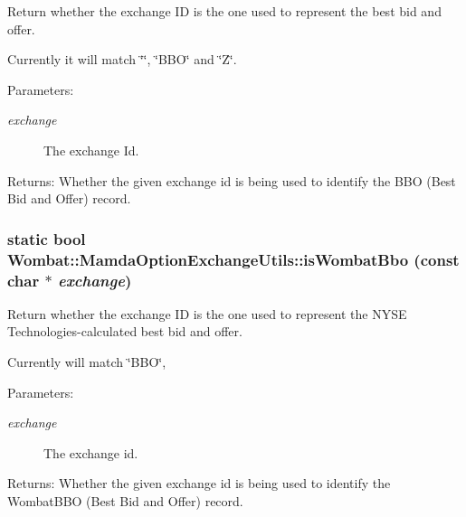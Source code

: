 Return whether the exchange ID is the one used to represent the best bid and offer. 

Currently it will match \char`\"{}\char`\"{}, \char`\"{}BBO\char`\"{} and \char`\"{}Z\char`\"{}.

\begin{Desc}
\item[Parameters:]
\begin{description}
\item[{\em exchange}]The exchange Id.\end{description}
\end{Desc}
\begin{Desc}
\item[Returns:]Whether the given exchange id is being used to identify the BBO (Best Bid and Offer) record. \end{Desc}
\hypertarget{classWombat_1_1MamdaOptionExchangeUtils_f667d49e25e581cd95a39b1fda2802c1}{
\subsubsection[isWombatBbo]{\setlength{\rightskip}{0pt plus 5cm}static bool Wombat::Mamda\-Option\-Exchange\-Utils::is\-Wombat\-Bbo (const char $\ast$ {\em exchange})}}
\label{classWombat_1_1MamdaOptionExchangeUtils_f667d49e25e581cd95a39b1fda2802c1}


Return whether the exchange ID is the one used to represent the NYSE Technologies-calculated best bid and offer. 

Currently will match \char`\"{}BBO\char`\"{},

\begin{Desc}
\item[Parameters:]
\begin{description}
\item[{\em exchange}]The exchange id.\end{description}
\end{Desc}
\begin{Desc}
\item[Returns:]Whether the given exchange id is being used to identify the Wombat\-BBO (Best Bid and Offer) record. \end{Desc}
